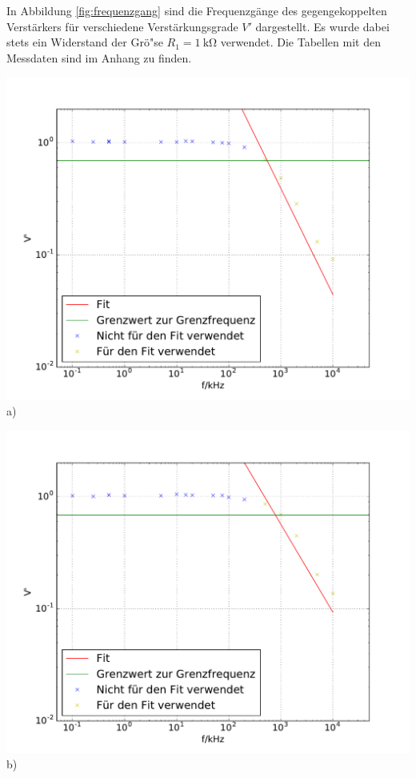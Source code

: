 \documentclass[]{scrartcl}
\begin{document}
In Abbildung \ref{fig:frequenzgang} sind die Frequenzgänge des gegengekoppelten Verstärkers für verschiedene Verstärkungsgrade $V'$ dargestellt. Es wurde dabei stets ein Widerstand der Grö"se $R_1=\SI{1}{\kilo\ohm}$ verwendet. Die Tabellen mit den Messdaten sind im Anhang zu finden.\\
\begin{minipage}[t]{0.6\textwidth}
		\includegraphics[width=\textwidth]{images/plot1.pdf}
		\centering
		a)
\end{minipage}
\begin{minipage}[t]{0.6\textwidth}
		\includegraphics[width=\textwidth]{images/plot2.pdf}
		\centering
		b)
\end{minipage} \\
\end{document}
